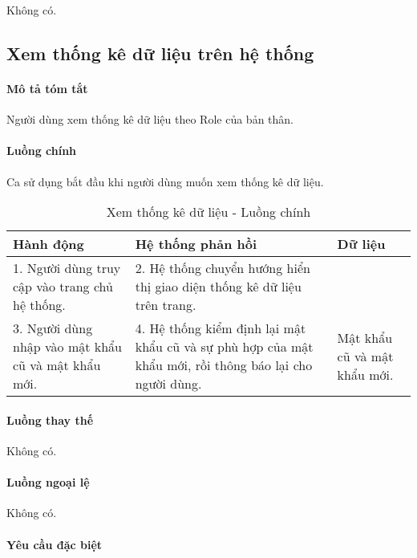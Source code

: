 \documentclass[./../main.tex]{subfiles}
\begin{document}
Không có.

\subsection{Xem thống kê dữ liệu trên hệ thống}

\paragraph*{Mô tả tóm tắt}

Người dùng xem thống kê dữ liệu theo Role của bản thân.

\paragraph*{Luồng chính} Ca sử dụng bắt đầu khi người dùng muốn xem thống kê dữ liệu.

\begin{table}[H]
	\caption{Xem thống kê dữ liệu - Luồng chính}
	\label{tab:view_dashboard}
	\begin{tabularx}{\textwidth}{|X|X|X|}
		\hline
		\textbf{Hành động}                                  & \textbf{Hệ thống phản hồi}                                                                              & \textbf{Dữ liệu}             \\ \hline
		1. Người dùng truy cập vào trang chủ hệ thống.      & 2. Hệ thống chuyển hướng hiển thị giao diện thống kê dữ liệu trên trang.                                &                              \\ \hline
		3. Người dùng nhập vào mật khẩu cũ và mật khẩu mới. & 4. Hệ thống kiểm định lại mật khẩu cũ và sự phù hợp của mật khẩu mới, rồi thông báo lại cho người dùng. & Mật khẩu cũ và mật khẩu mới. \\ \hline
	\end{tabularx}
\end{table}

\paragraph*{Luồng thay thế} Không có.

\paragraph*{Luồng ngoại lệ} Không có.

\paragraph*{Yêu cầu đặc biệt}
\end{document}
